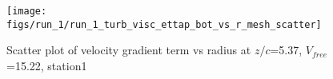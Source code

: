 \begin{figure}[H]
\centering
\texttt{[image: figs/run\_1/run\_1\_turb\_visc\_ettap\_bot\_vs\_r\_mesh\_scatter]}
\caption{Scatter plot of velocity gradient term vs radius at $z/c$=5.37, $V_{free}$=15.22, station1}
\label{fig:run_1_turb_visc_ettap_bot_vs_r_mesh_scatter}
\end{figure}


